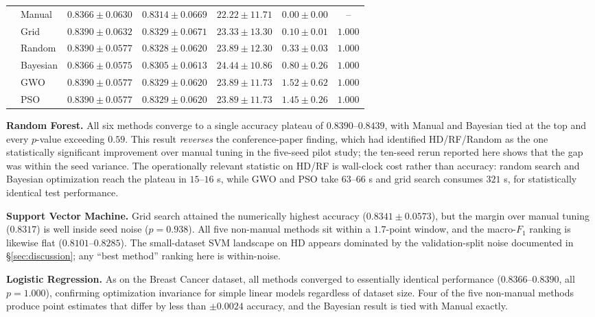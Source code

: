 \documentclass[letterpaper, 10 pt, conference]{ieeeconf}
\begin{document}
\begin{table}[t]
\begin{tabular}{|l|l|c|c|c|c|c|}
		& Manual   & $0.8366 \pm 0.0630$ & $0.8314 \pm 0.0669$ & $22.22 \pm 11.71$ & $0.00 \pm 0.00$ & -- \\
		& Grid     & $0.8390 \pm 0.0632$ & $0.8329 \pm 0.0671$ & $23.33 \pm 13.30$ & $0.10 \pm 0.01$ & $1.000$ \\
		& Random   & $0.8390 \pm 0.0577$ & $0.8328 \pm 0.0620$ & $23.89 \pm 12.30$ & $0.33 \pm 0.03$ & $1.000$ \\
		& Bayesian & $0.8366 \pm 0.0575$ & $0.8305 \pm 0.0613$ & $24.44 \pm 10.86$ & $0.80 \pm 0.26$ & $1.000$ \\
		& GWO      & $0.8390 \pm 0.0577$ & $0.8329 \pm 0.0620$ & $23.89 \pm 11.73$ & $1.52 \pm 0.62$ & $1.000$ \\
		& PSO      & $0.8390 \pm 0.0577$ & $0.8329 \pm 0.0620$ & $23.89 \pm 11.73$ & $1.45 \pm 0.26$ & $1.000$ \\
		\hline
	\end{tabular}
\end{table}

\textbf{Random Forest.} All six methods converge to a single accuracy plateau of $0.8390$--$0.8439$, with Manual and Bayesian tied at the top and every $p$-value exceeding $0.59$. This result \emph{reverses} the conference-paper finding, which had identified HD/RF/Random as the one statistically significant improvement over manual tuning in the five-seed pilot study; the ten-seed rerun reported here shows that the gap was within the seed variance. The operationally relevant statistic on HD/RF is wall-clock cost rather than accuracy: random search and Bayesian optimization reach the plateau in $15$--$16$ s, while GWO and PSO take $63$--$66$ s and grid search consumes $321$ s, for statistically identical test performance.

\textbf{Support Vector Machine.} Grid search attained the numerically highest accuracy ($0.8341 \pm 0.0573$), but the margin over manual tuning ($0.8317$) is well inside seed noise ($p = 0.938$). All five non-manual methods sit within a $1.7$-point window, and the macro-$F_1$ ranking is likewise flat ($0.8101$--$0.8285$). The small-dataset SVM landscape on HD appears dominated by the validation-split noise documented in \S\ref{sec:discussion}; any ``best method'' ranking here is within-noise.

\textbf{Logistic Regression.} As on the Breast Cancer dataset, all methods converged to essentially identical performance ($0.8366$--$0.8390$, all $p = 1.000$), confirming optimization invariance for simple linear models regardless of dataset size. Four of the five non-manual methods produce point estimates that differ by less than $\pm 0.0024$ accuracy, and the Bayesian result is tied with Manual exactly.
\end{document}

